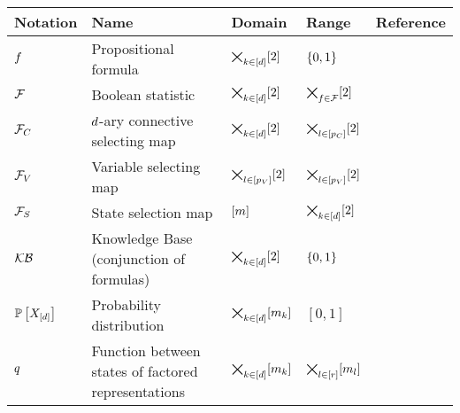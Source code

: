 \begin{center}
    \begin{tabular}{|p{\fivecolumnwidth}|p{\threecolumnwidth}|p{\fivecolumnwidth}|p{\fivecolumnwidth}|p{\fivecolumnwidth}|}
        \hline
        \rule{0pt}{\rowheight} \textbf{Notation} & \textbf{Name}                                       & \textbf{Domain}                                             & \textbf{Range}                                              & \textbf{Reference}                   \\
        \hline
        \rule{0pt}{\rowheight} $f$      & Propositional formula                               & $\bigtimes_{k\in[d]}[2]$                                               & $\{0,1\}$                                                    & {def:formulas}                \\
        \rule{0pt}{\rowheight} $\mathcal{F}$        & Boolean statistic                                   & $\bigtimes_{k\in[d]}[2]$                                               & $\bigtimes_{f\in\mathcal{F}}[2]$                                                    & {def:mln}                \\
        \rule{0pt}{\rowheight} $\mathcal{F}_{C}$  & $d$-ary connective selecting map & $\bigtimes_{k\in[d]}[2]$                                               & $\bigtimes_{l\in[p_{C}]}[2]$ & {def:connectiveSelector} \\
        \rule{0pt}{\rowheight} $\mathcal{F}_{V}$  & Variable selecting map                              & $\bigtimes_{l\in[p_{V}]}[2]$ & $\bigtimes_{l\in[p_{V}]}[2]$ & {def:variableSelector} \\ %
        \rule{0pt}{\rowheight} $\mathcal{F}_{S}$  & State selection map                                 & $[m]$                                                 & $\bigtimes_{k\in[d]}[2]$ & {def:stateSelector} \\
        \rule{0pt}{\rowheight} $\mathcal{KB}$             & Knowledge Base (conjunction of formulas)            & $\bigtimes_{k\in[d]}[2]$                                               & $\{0,1\}$                                                    &                                      \\
        \rule{0pt}{\rowheight} $\mathbb{P}\left[X_{[d]}\right]$       & Probability distribution                            & $\bigtimes_{k\in[d]}[m_{k}]$                                                & $[0,1]$                                                     & {def:probabilityDistribution} \\
        \rule{0pt}{\rowheight} $q$     & Function between states of factored representations                   & $\bigtimes_{k\in[d]}[m_{k}]$                                                & $\bigtimes_{l\in[r]}[m_{l}]$                                             &                                      \\
        \hline
    \end{tabular}
\end{center}

